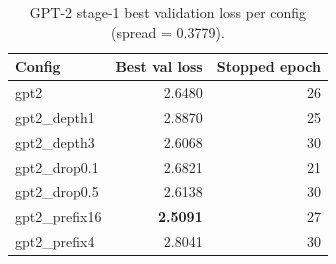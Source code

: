 \begin{table}[ht]
\centering
\caption{GPT-2 stage-1 best validation loss per config (spread = 0.3779).}
\label{tab:s1_valloss_gpt2}
\footnotesize
\begin{tabular}{lrr}
\toprule
Config & Best val loss & Stopped epoch \\
\midrule
gpt2 & 2.6480 & 26 \\
gpt2\_depth1 & 2.8870 & 25 \\
gpt2\_depth3 & 2.6068 & 30 \\
gpt2\_drop0.1 & 2.6821 & 21 \\
gpt2\_drop0.5 & 2.6138 & 30 \\
gpt2\_prefix16 & \textbf{2.5091} & 27 \\
gpt2\_prefix4 & 2.8041 & 30 \\
\bottomrule
\end{tabular}
\end{table}
